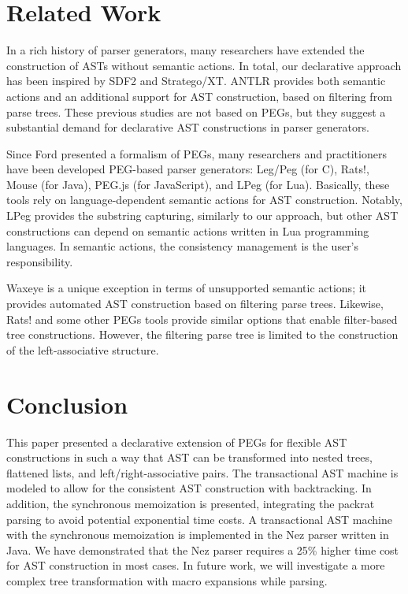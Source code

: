 \documentclass[JIP]{ipsj}
\begin{document}
\section{Related Work}



In a rich history of parser generators, many researchers have extended the construction of ASTs without semantic actions\cite{CACM92_Eli,LDTA10_ASTConstruction}. In total, our declarative approach has been inspired by SDF2 and Stratego/XT\cite{SCP08_Stratego,OOPSLA10_ParadiseLost}. ANTLR\cite{PLDI11_Antlr} provides both semantic actions and an additional support for AST construction, based on filtering from parse trees. These previous studies are not based on PEGs, but they suggest a substantial demand for declarative AST constructions in parser generators. 

Since Ford presented a formalism of PEGs\cite{POPL04_PEG}, many researchers and practitioners have been developed PEG-based parser generators: Leg/Peg (for C), Rats!\cite{PLDI06_Rats}, Mouse\cite{FI07_Mouse} (for Java), PEG.js (for JavaScript), and LPeg \cite{LPeg} (for Lua). Basically, these tools rely on language-dependent semantic actions for AST construction. Notably, LPeg provides the substring capturing, similarly to our approach, but other AST constructions can depend on semantic actions written in Lua programming languages. In semantic actions, the consistency management is the user's responsibility.

Waxeye\cite{Waxeye} is a unique exception in terms of unsupported semantic actions; it  provides automated AST construction based on filtering parse trees. Likewise, Rats! and some other PEGs tools provide similar options that enable filter-based tree constructions. However, the filtering parse tree is limited to the construction of the left-associative structure. 

\section{Conclusion}

This paper presented a declarative extension of PEGs for flexible AST constructions in such a way that AST can be transformed into nested trees, flattened lists, and left/right-associative pairs. The transactional AST machine is modeled to allow for the consistent AST construction with backtracking. In addition, the synchronous memoization is presented, integrating the packrat parsing to avoid potential exponential time costs. A transactional AST machine with the synchronous memoization is implemented in the Nez parser written in Java. We have demonstrated that the Nez parser requires a 25\% higher time cost for AST construction in most cases. In future work, we will investigate a more complex tree transformation with macro expansions while parsing.
   
\end{document}
